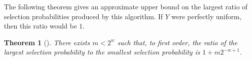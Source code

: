 \documentclass[12pt]{article}
\newtheorem{theorem}{Theorem}[section]
\newtheorem{lemma}[theorem]{Lemma}
\newcommand{\todo}[1]{{\color{red}{TO DO: \sc #1}}}
\newcommand{\pr}{\mathbb{P}} %
\begin{document}
%
%
%
%
%
%
%
%

The following theorem gives an approximate upper bound on the largest ratio of selection probabilities produced by this algorithm.
If $Y$ were perfectly uniform, then this ratio would be $1$.

\begin{theorem}[\citet{knuth_art_1997}] %
There exists $m < 2^w$ such that, to first order, the ratio of the largest selection probability to the smallest selection probability is $1 + m2^{-w+1}$.
\end{theorem}
\end{document}
